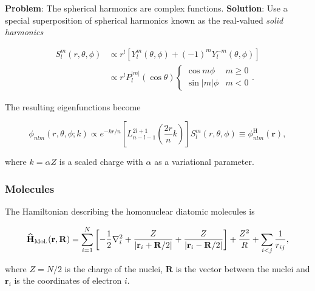 \begin{frame}
 \textbf{Problem}: The spherical harmonics are complex functions. 
 \shift
 \textbf{Solution}: Use a special superposition of spherical harmonics known as the real-valued \textit{solid harmonics}
 
 \begin{align}
S_l^m(r, \theta, \phi) &\propto r^l\left[Y_l^m(\theta, \phi) + (-1)^m Y_l^{-m}(\theta, \phi)\right] \\
 &\propto r^{l} P_l^{|m|}(\cos\theta) \begin{cases} \cos m\phi & m \ge 0 \\ \sin|m|\phi &  m < 0 \end{cases}.     
\end{align}

 \end{frame}
 
 \begin{frame}
  The resulting eigenfunctions become 
  
\begin{equation*}
  \phi_{nlm}(r, \theta, \phi; k) \propto e^{-kr/n}\left[L_{n-l-1}^{2l+1}\left(\frac{2r}{n}k\right)\right] S_l^m(r, \theta, \phi) \equiv \phi^\mathrm{H}_{nlm}(\mathbf{r}), 
\end{equation*}

where $k = \alpha Z$ is a scaled charge with $\alpha$ as a variational parameter.
 \end{frame}

\begin{frame}
 \frametitle{Molecules}
 
 The Hamiltonian describing the homonuclear diatomic molecules is
 
 \begin{equation*}
 {\bf\widehat{H}}_{\mathrm{Mol.}}(\mathbf{r}, \mathbf{R}) = \sum_{i=1}^N \left[-\frac{1}{2}\nabla_i^2 + \frac{Z}{|\mathbf{r}_i + \mathbf{R}/2|} + \frac{Z}{|\mathbf{r}_i - \mathbf{R}/2|}\right] + \frac{Z^2}{R} + \sum_{i<j} \frac{1}{r_{ij}},
\end{equation*}

where $Z=N/2$ is the charge of the nuclei, $\mathbf{R}$ is the vector between the nuclei and $\mathbf{r}_i$ is the coordinates of electron $i$.
 
\end{frame}


